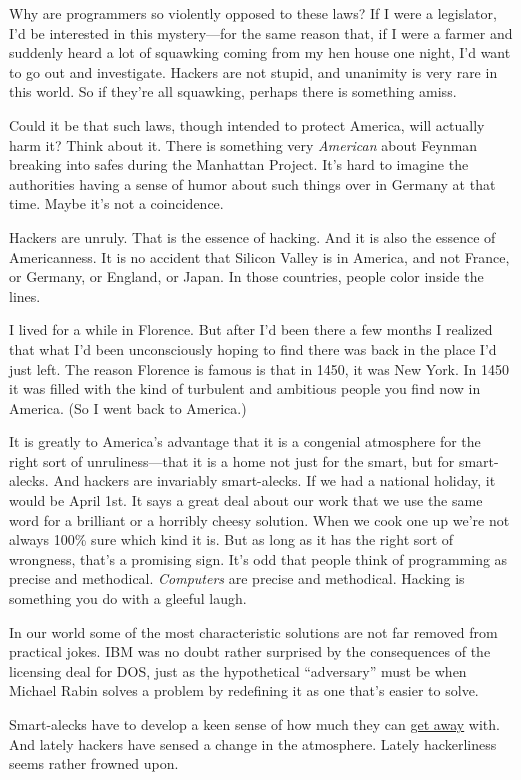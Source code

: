 \documentclass[12pt]{book}
\begin{document}
Why are programmers so violently opposed to these laws? If I were a
legislator, I'd be interested in this mystery---for the same reason
that, if I were a farmer and suddenly heard a lot of squawking coming
from my hen house one night, I'd want to go out and investigate. Hackers
are not stupid, and unanimity is very rare in this world. So if they're
all squawking, perhaps there is something amiss.

Could it be that such laws, though intended to protect America, will
actually harm it? Think about it. There is something very
\emph{American} about Feynman breaking into safes during the Manhattan
Project. It's hard to imagine the authorities having a sense of humor
about such things over in Germany at that time. Maybe it's not a
coincidence.

Hackers are unruly. That is the essence of hacking. And it is also the
essence of Americanness. It is no accident that Silicon Valley is in
America, and not France, or Germany, or England, or Japan. In those
countries, people color inside the lines.

I lived for a while in Florence. But after I'd been there a few months I
realized that what I'd been unconsciously hoping to find there was back
in the place I'd just left. The reason Florence is famous is that in
1450, it was New York. In 1450 it was filled with the kind of turbulent
and ambitious people you find now in America. (So I went back to
America.)

It is greatly to America's advantage that it is a congenial atmosphere
for the right sort of unruliness---that it is a home not just for the
smart, but for smart-alecks. And hackers are invariably smart-alecks. If
we had a national holiday, it would be April 1st. It says a great deal
about our work that we use the same word for a brilliant or a horribly
cheesy solution. When we cook one up we're not always 100\% sure which
kind it is. But as long as it has the right sort of wrongness, that's a
promising sign. It's odd that people think of programming as precise and
methodical. \emph{Computers} are precise and methodical. Hacking is
something you do with a gleeful laugh.

In our world some of the most characteristic solutions are not far
removed from practical jokes. IBM was no doubt rather surprised by the
consequences of the licensing deal for DOS, just as the hypothetical
``adversary'' must be when Michael Rabin solves a problem by redefining
it as one that's easier to solve.

Smart-alecks have to develop a keen sense of how much they can
\href{say.html}{get away} with. And lately hackers have sensed a change
in the atmosphere. Lately hackerliness seems rather frowned upon.
\end{document}
